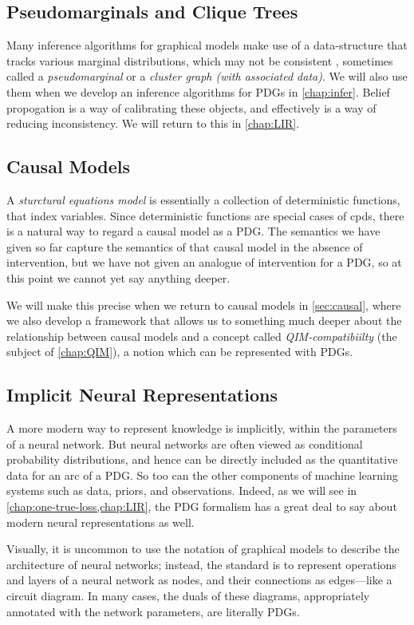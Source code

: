 \subsection{Pseudomarginals and Clique Trees}

Many inference algorithms for graphical models make use of a data-structure that tracks various marginal distributions, which may not be consistent \cite{wainwright2003tree,wainwright2008graphical,koller2009probabilistic},
sometimes called a \emph{pseudomarginal} or a \emph{cluster graph (with associated data)}. 
We will also use them when we develop an inference algorithms for PDGs in \cref{chap:infer}. 
Belief propogation is a way of calibrating these objects, and effectively is a way of reducing inconsistency. We will return to this in \cref{chap:LIR}. 


\subsection{Causal Models}
    \label{ssec:capture-causal-models}
    
A \emph{sturctural equations model} \cite{pearl2009causality} is essentially a collection of deterministic functions, that index variables. Since deterministic functions are special cases of cpds, there is a natural way to regard a causal model as a PDG. 
The semantics we have given so far capture the semantics of that causal model in the absence of intervention, but we have not given an analogue of intervention for a PDG, so at this point we cannot yet say anything deeper. 

We will make this precise when we return to causal models in 
\cref{sec:causal}, 
where we also develop a framework that allows us to something much deeper about the relationship between causal models and a concept called \emph{QIM-compatibiilty} (the subject of \cref{chap:QIM}), a notion which can be represented with PDGs. 

\subsection{Implicit Neural Representations}

A more modern way to represent knowledge is implicitly, within the parameters of a neural network. 
But neural networks are often viewed as conditional probability distributions, and hence can be directly included as the quantitative data for an arc of a PDG.
So too can the other components of machine learning systems such as data, priors, and observations. 
Indeed, as we will see in \cref{chap:one-true-loss,chap:LIR}, the PDG formalism has a great deal to say about modern neural representations as well.

Visually, it is uncommon to use the notation of graphical models to describe the architecture of neural networks; instead, the standard is to represent operations and layers of a neural network as nodes, and their connections as edges---like a circuit diagram.
In many cases, the duals of these diagrams, appropriately annotated with the network parameters, are literally PDGs.
